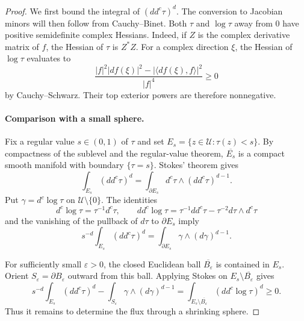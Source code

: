 \begin{proof}
We first bound the integral of $(dd^c\tau)^d$. The conversion to
Jacobian minors will then follow from Cauchy--Binet.
Both $\tau$ and $\log\tau$ away from $0$ have positive semidefinite
complex Hessians. Indeed, if $Z$ is the complex derivative matrix of $f$,
the Hessian of $\tau$ is $Z^*Z$. For a complex direction $\xi$, the
Hessian of $\log\tau$ evaluates to
\[
\frac{|f|^2|df(\xi)|^2
       -|\langle df(\xi),f\rangle|^2}{|f|^4}\geq0
\]
by Cauchy--Schwarz. Their top exterior powers are therefore nonnegative.

\paragraph{Comparison with a small sphere.}
Fix a regular value $s\in(0,1)$ of $\tau$ and set
$E_s=\{z\in\mathcal U:\tau(z)<s\}$. By compactness of the sublevel and
the regular-value theorem, $\overline{E_s}$ is a compact smooth manifold
with boundary $\{\tau=s\}$. Stokes' theorem gives
\[
\int_{E_s}(dd^c\tau)^d
 =\int_{\partial E_s}d^c\tau\wedge(dd^c\tau)^{d-1}.
\]
Put $\gamma=d^c\log\tau$ on $\mathcal U\setminus\{0\}$. The identities
\[
d^c\log\tau=\tau^{-1}d^c\tau,
\qquad
dd^c\log\tau=\tau^{-1}dd^c\tau
                 -\tau^{-2}d\tau\wedge d^c\tau
\]
and the vanishing of the pullback of $d\tau$ to $\partial E_s$ imply
\begin{equation}\label{eq:mass-level-flux}
s^{-d}\int_{E_s}(dd^c\tau)^d
 =\int_{\partial E_s}\gamma\wedge(d\gamma)^{d-1}.
\end{equation}

For sufficiently small $\varepsilon>0$, the closed Euclidean ball
$\overline{B_\varepsilon}$ is contained in $E_s$. Orient
$S_\varepsilon=\partial B_\varepsilon$ outward from this ball. Applying
Stokes on $E_s\setminus\overline{B_\varepsilon}$ gives
\begin{equation}\label{eq:mass-punctured-flux}
s^{-d}\int_{E_s}(dd^c\tau)^d
 -\int_{S_\varepsilon}\gamma\wedge(d\gamma)^{d-1}
 =\int_{E_s\setminus\overline{B_\varepsilon}}
                     (dd^c\log\tau)^d\geq0.
\end{equation}
Thus it remains to determine the flux through a shrinking sphere.


\end{proof}
